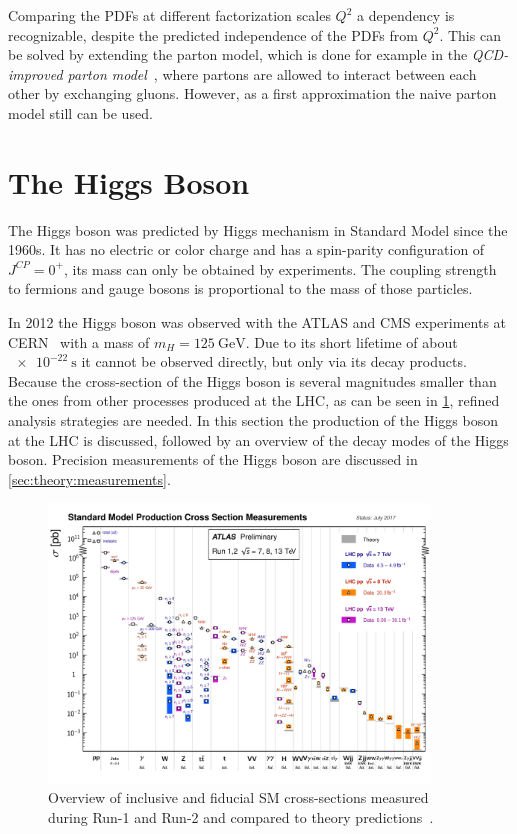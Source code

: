 Comparing the PDFs at different factorization scales $Q^2$ a dependency is recognizable,
despite the predicted independence of the PDFs from $Q^2$.
This can be solved by extending the parton model, which is done for example in the \emph{QCD-improved parton model}~\cite{col98}, where
partons are allowed to interact between each other by exchanging gluons.
However, as a first approximation the naive parton model still can be used.

\section{The Higgs Boson}\label{sec:theory:higgs}

The Higgs boson was predicted by Higgs mechanism in Standard Model since the 1960s.
It has no electric or color charge and has a spin-parity configuration of $J^{CP} = 0^+$, its mass can only be obtained by experiments.
The coupling strength to fermions and gauge bosons is proportional to the mass of those particles.

In 2012 the Higgs boson was observed with the ATLAS and CMS experiments at CERN~\cite{HiggsDiscoveryATLAS,HiggsDiscoveryCMS} with a
mass of $m_H = \SI{125}{\GeV}$.
Due to its short lifetime of about $\SI{e-22}{\s}$ it cannot be observed directly, but only via its decay products.
Because the cross-section of the Higgs boson is several magnitudes smaller than the ones from other processes produced at the LHC,
as can be seen in \cref{fig:theory:higgs:smxsec}, refined analysis strategies are needed.
In this section the production of the Higgs boson at the LHC is discussed, followed by an overview of the decay modes of the Higgs boson.
Precision measurements of the Higgs boson are discussed in \cref{sec:theory:measurements}.

\begin{figure}[htb]
    \centering
    \includegraphics[width=0.9\textwidth]{./figures/theory/sm_xsec.eps}
    \caption{Overview of inclusive and fiducial SM cross-sections measured during Run-1 and Run-2 and compared to theory predictions~\cite{SMPublicResults}.}\label{fig:theory:higgs:smxsec}
\end{figure}

